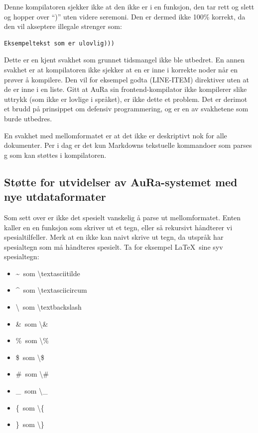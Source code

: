 \documentclass[norsk, 11pt, a4paper]{article}
\begin{document}
Denne kompilatoren sjekker ikke at den ikke er i en funksjon, den tar rett og slett og hopper over ``)'' uten videre seremoni.
Den er dermed ikke 100\% korrekt, da den vil akseptere illegale strenger som:
\begin{lstlisting}
Eksempeltekst som er ulovlig)))
\end{lstlisting}
Dette er en kjent svakhet som grunnet tidsmangel ikke ble utbedret. En annen svakhet er at kompilatoren ikke sjekker at en er inne i korrekte noder når en prøver å kompilere. Den vil for eksempel godta (LINE-ITEM) direktiver uten at de er inne i en liste. Gitt at AuRa sin frontend-kompilator ikke kompilerer slike uttrykk (som ikke er lovlige i språket), er ikke dette et problem. Det er derimot et brudd på prinsippet om defensiv programmering, og er en av svakhetene som burde utbedres.

En svakhet med mellomformatet er at det ikke er deskriptivt nok for alle dokumenter. Per i dag er det kun Markdowns tekstuelle kommandoer som parses g som kan støttes i kompilatoren.

\subsection{Støtte for utvidelser av AuRa-systemet med nye utdataformater}
Som sett over er ikke det spesielt vanskelig å parse ut mellomformatet. 
Enten kaller en en funksjon som skriver ut et tegn, eller så rekursivt håndterer vi spesialtilfeller.
Merk at en ikke kan naivt skrive ut tegn, da utspråk har spesialtegn som må håndteres spesielt. Ta for eksempel \LaTeX\  sine syv spesialtegn:
\begin{itemize}
\item \textasciitilde\  som \textbackslash textasciitilde
\item \textasciicircum\  som \textbackslash textasciicircum
\item \textbackslash\  som \textbackslash textbackslash
\item \&\  som \textbackslash \&
\item \%\  som \textbackslash \%
\item \$\  som \textbackslash \$
\item \#\  som \textbackslash \#
\item \_\  som \textbackslash \_
\item \{\  som \textbackslash \{
\item \}\  som \textbackslash \}
\end{itemize}
\end{document}
